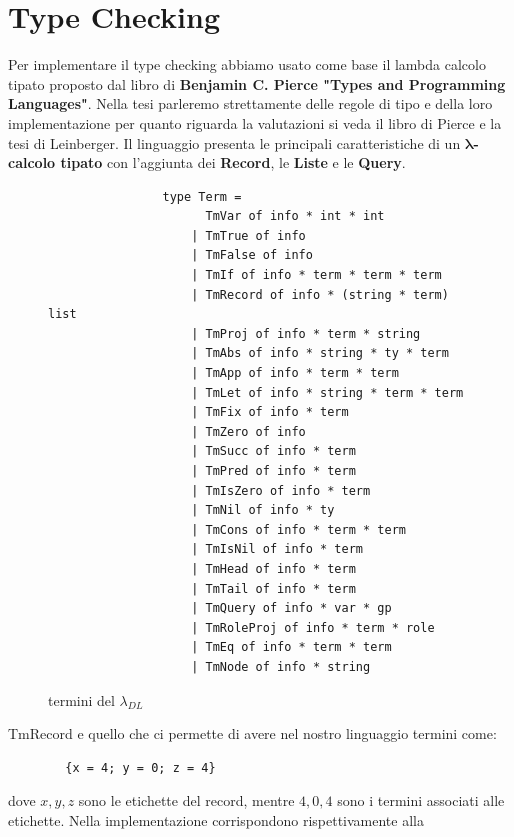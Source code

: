     \section{Type Checking}
        Per implementare il type checking abbiamo usato come base il lambda calcolo tipato proposto dal libro di \textbf{Benjamin C. Pierce "Types and Programming Languages"}.
        Nella tesi parleremo strettamente delle regole di tipo e della loro implementazione per quanto riguarda la valutazioni si veda il libro di Pierce e la tesi di Leinberger.
        Il linguaggio presenta le principali caratteristiche di un \textbf{ $\boldsymbol{\lambda}$-calcolo tipato} con l'aggiunta dei \textbf{Record}, le \textbf{Liste} e le \textbf{Query}.
        \begin{figure}[h] 
            \begin{verbatim}
                type Term =
                      TmVar of info * int * int 
                    | TmTrue of info 
                    | TmFalse of info 
                    | TmIf of info * term * term * term 
                    | TmRecord of info * (string * term) list 
                    | TmProj of info * term * string 
                    | TmAbs of info * string * ty * term 
                    | TmApp of info * term * term 
                    | TmLet of info * string * term * term 
                    | TmFix of info * term 
                    | TmZero of info 
                    | TmSucc of info * term 
                    | TmPred of info * term 
                    | TmIsZero of info * term 
                    | TmNil of info * ty 
                    | TmCons of info * term * term 
                    | TmIsNil of info * term 
                    | TmHead of info * term 
                    | TmTail of info * term  
                    | TmQuery of info * var * gp
                    | TmRoleProj of info * term * role
                    | TmEq of info * term * term
                    | TmNode of info * string
            \end{verbatim}
        \caption{termini del $\lambda_{DL}$}
        \end{figure}
        TmRecord e quello che ci permette di avere nel nostro linguaggio termini come:
        \begin{verbatim}
        {x = 4; y = 0; z = 4}
        \end{verbatim}
        dove $x, y, z$ sono le etichette del record, mentre $4, 0, 4$ sono i termini associati alle etichette. Nella implementazione corrispondono rispettivamente alla
